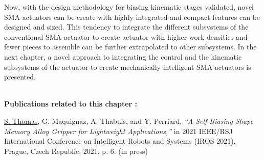 Now, with the design methodology for biasing kinematic stages validated, novel SMA actuators can be create with highly integrated and compact features can be designed and sized. This tendency to integrate the different subsystems of the conventional SMA actuator to create actuator with higher work densities and fewer pieces to assemble can be further extrapolated to other subsystems. In the next chapter, a novel approach to integrating the control and the kinematic subsystems of the actuator to create mechanically intelligent SMA actuators is presented.

\vspace*{\fill}
\noindent\hrulefill \\
\textbf{\large Publications related to this chapter :}

\underline{S. Thomas}, G. Maquignaz, A. Thabuis, and Y. Perriard, \textit{“A Self-Biasing Shape Memory Alloy Gripper for Lightweight Applications,”} in 2021 IEEE/RSJ International Conference on Intelligent Robots and Systems (IROS 2021), Prague, Czech Republic, 2021, p. 6. (in press)
